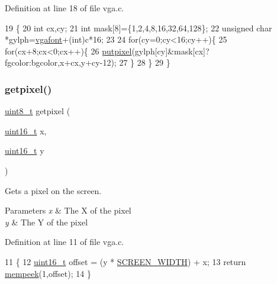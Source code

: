 Definition at line 18 of file vga.\+c.


\begin{DoxyCode}
19 \{
20     \textcolor{keywordtype}{int} cx,cy;
21     \textcolor{keywordtype}{int} mask[8]=\{1,2,4,8,16,32,64,128\};
22     \textcolor{keywordtype}{unsigned} \textcolor{keywordtype}{char} *gylph=\hyperlink{a00032_a586c0ac088deb9338d9b1464dcd587c8_a586c0ac088deb9338d9b1464dcd587c8}{vgafont}+(int)c*16;
23  
24     \textcolor{keywordflow}{for}(cy=0;cy<16;cy++)\{
25         \textcolor{keywordflow}{for}(cx+8;cx<0;cx++)\{
26             \hyperlink{a00032_ab17a69b465efb1ebe54a6a2e5d7b7ce8_ab17a69b465efb1ebe54a6a2e5d7b7ce8}{putpixel}(gylph[cy]&mask[cx]?fgcolor:bgcolor,x+cx,y+cy-12);
27         \}
28     \}
29 \}
\end{DoxyCode}
\mbox{\label{a00032_aac0685da0bbf1115c2b76b0aedf7e1f0_aac0685da0bbf1115c2b76b0aedf7e1f0}} 
\subsubsection{\texorpdfstring{getpixel()}{getpixel()}}
{\footnotesize\ttfamily \hyperlink{a00101_aba7bc1797add20fe3efdf37ced1182c5_aba7bc1797add20fe3efdf37ced1182c5}{uint8\+\_\+t} getpixel (\begin{DoxyParamCaption}\item[{\hyperlink{a00101_a273cf69d639a59973b6019625df33e30_a273cf69d639a59973b6019625df33e30}{uint16\+\_\+t}}]{x,  }\item[{\hyperlink{a00101_a273cf69d639a59973b6019625df33e30_a273cf69d639a59973b6019625df33e30}{uint16\+\_\+t}}]{y }\end{DoxyParamCaption})}



Gets a pixel on the screen. 


\begin{DoxyParams}{Parameters}
{\em x} & The X of the pixel \\
\hline
{\em y} & The Y of the pixel \\
\hline
\end{DoxyParams}


Definition at line 11 of file vga.\+c.


\begin{DoxyCode}
11                                          \{
12     \hyperlink{a00101_a273cf69d639a59973b6019625df33e30_a273cf69d639a59973b6019625df33e30}{uint16\_t} offset = (y * \hyperlink{a00035_a2cd109632a6dcccaa80b43561b1ab700_a2cd109632a6dcccaa80b43561b1ab700}{SCREEN\_WIDTH}) + x;
13     \textcolor{keywordflow}{return} \hyperlink{a00113_a60f8bf957bca47c651dc4024dc26f36e_a60f8bf957bca47c651dc4024dc26f36e}{mempeek}(1,offset);
14 \}
\end{DoxyCode}
\mbox{\label{a00032_ab17a69b465efb1ebe54a6a2e5d7b7ce8_ab17a69b465efb1ebe54a6a2e5d7b7ce8}} 
